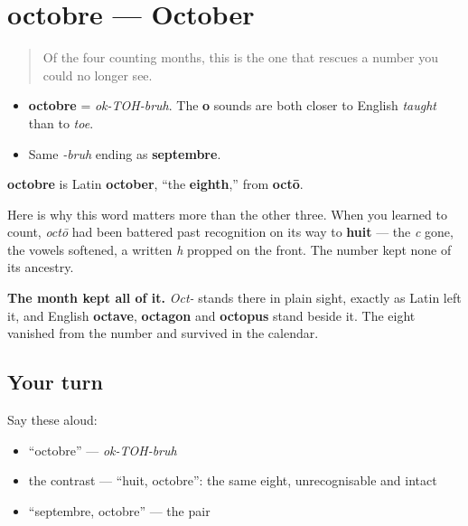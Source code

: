 \section[octobre]{octobre — October}

\label{lesson:FR-C09-octobre}



\begin{quote}
Of the four counting months, this is the one that rescues a number you could no longer see.
\end{quote}

\begin{sounds}
\begin{itemize}
\raggedright
  \item \textbf{octobre} = \emph{ok-TOH-bruh}. The \textbf{o} sounds are both closer to English \emph{taught} than to \emph{toe}.
  \item Same \emph{-bruh} ending as \textbf{septembre}.
\end{itemize}
\end{sounds}

\begin{cousinweb}
\textbf{octobre} is Latin \textbf{october}, \textquotedblleft{}the \textbf{eighth},\textquotedblright{} from \textbf{octō}.

Here is why this word matters more than the other three. When you learned to count, \emph{octō} had been battered past recognition on its way to \textbf{huit} — the \emph{c} gone, the vowels softened, a written \emph{h} propped on the front. The number kept none of its ancestry.

\textbf{The month kept all of it.} \emph{Oct-} stands there in plain sight, exactly as Latin left it, and English \textbf{octave}, \textbf{octagon} and \textbf{octopus} stand beside it. The eight vanished from the number and survived in the calendar.
\end{cousinweb}

\subsection*{Your turn}
Say these aloud:

\begin{itemize}
\raggedright
  \item \textquotedblleft{}octobre\textquotedblright{} — \emph{ok-TOH-bruh}
  \item the contrast — \textquotedblleft{}huit, octobre\textquotedblright{}: the same eight, unrecognisable and intact
  \item \textquotedblleft{}septembre, octobre\textquotedblright{} — the pair
\end{itemize}


